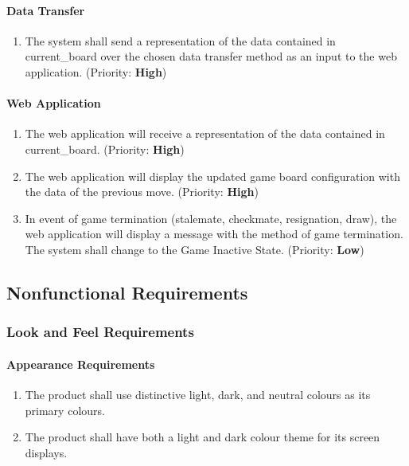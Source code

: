 \documentclass[12pt]{article}
\begin{document}
\paragraph{Data Transfer}
\begin{enumerate}[{BD}1., leftmargin=2\parindent]
    \item The system shall send a representation of the data contained in current\_board over the chosen data transfer method as an input to the web application. (Priority: \textbf{High}) 
\end{enumerate}

\paragraph{Web Application}
\begin{enumerate}[{BA}1., leftmargin=2\parindent]
    \item The web application will receive a representation of the data contained in current\_board. (Priority: \textbf{High})
    \item The web application will display the updated game board configuration with the data of the previous move. (Priority: \textbf{High})
    \item In event of game termination (stalemate, checkmate, resignation, draw), the web application will display a message with the method of game termination. The system shall change to the Game Inactive State. (Priority: \textbf{Low}) 
\end{enumerate}


\subsection{Nonfunctional Requirements}

\setcounter{vnvSectionNfr}{1}

\setcounter{nfrNum}{1}

\subsubsection{Look and Feel Requirements}
\label{NFR_LF}
\paragraph{Appearance Requirements}
\begin{enumerate}[{LF}1., leftmargin=2\parindent]
    \item The product shall use distinctive light, dark, and neutral colours as its primary colours.
    \item The product shall have both a light and dark colour theme for its screen displays.
\end{enumerate}
\end{document}
